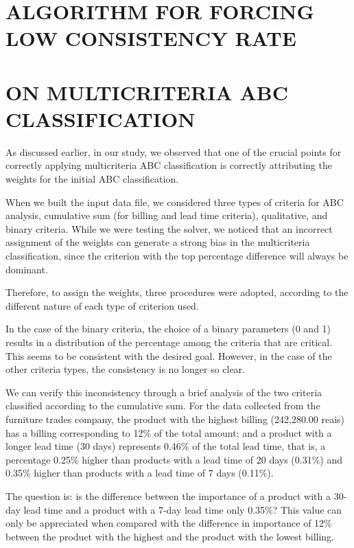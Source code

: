 \documentclass[10pt,fleqn,a4paper,twoside]{article}
\begin{document}
    \section{ALGORITHM FOR FORCING LOW CONSISTENCY RATE}
    
    \section{ON MULTICRITERIA ABC CLASSIFICATION}

As discussed earlier, in our study, we observed that one of the crucial points for correctly applying multicriteria ABC classification is correctly attributing the weights for the initial ABC classification.

When we built the input data file, we considered three types of criteria for ABC analysis, cumulative sum (for billing and lead time criteria), qualitative, and binary criteria. While we were testing the solver, we noticed that an incorrect assignment of the weights can generate a strong bias in the multicriteria classification, since the criterion with the top percentage difference will always be dominant.

Therefore, to assign the weights, three procedures were adopted, according to the different nature of each type of criterion used.

In the case of the binary criteria, the choice of a binary parameters (0 and 1) results in a distribution of the percentage among the criteria that are critical. This seems to be consistent with the desired goal. However, in the case of the other criteria types, the consistency is no longer so clear. 

We can verify this inconsistency through a brief analysis of the two criteria classified according to the cumulative sum. For the data collected from the furniture trades company, the product with the highest billing (242,280.00 reais) has a billing corresponding to 12\% of the total amount; and a product with a longer lead time (30 days) represents 0.46\% of the total lead time, that is, a percentage 0.25\% higher than products with a lead time of 20 days (0.31\%) and 0.35\% higher than products with a lead time of 7 days (0.11\%).  

The question is: is the difference between the importance of a product with a 30-day lead time and a product with a 7-day lead time only 0.35\%? This value can only be appreciated when compared with the difference in importance of 12\% between the product with the highest and the product with the lowest billing. 
\end{document}
